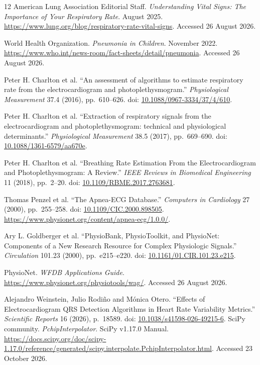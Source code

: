 \begin{thebibliography}{12}
American Lung Association Editorial Staff.
\emph{Understanding Vital Signs: The Importance of Your Respiratory Rate}.
August 2025. \url{https://www.lung.org/blog/respiratory-rate-vital-signs}.
Accessed 26 August 2026.

World Health Organization. \emph{Pneumonia in Children}.
November 2022. \url{https://www.who.int/news-room/fact-sheets/detail/pneumonia}.
Accessed 26 August 2026.

Peter H. Charlton et al.
``An assessment of algorithms to estimate respiratory rate from the electrocardiogram and photoplethysmogram.''
\emph{Physiological Measurement} 37.4 (2016), pp.~610--626.
doi: \href{https://doi.org/10.1088/0967-3334/37/4/610}{10.1088/0967-3334/37/4/610}.

Peter H. Charlton et al.
``Extraction of respiratory signals from the electrocardiogram and photoplethysmogram: technical and physiological determinants.''
\emph{Physiological Measurement} 38.5 (2017), pp.~669--690.
doi: \href{https://doi.org/10.1088/1361-6579/aa670e}{10.1088/1361-6579/aa670e}.

Peter H. Charlton et al.
``Breathing Rate Estimation From the Electrocardiogram and Photoplethysmogram: A Review.''
\emph{IEEE Reviews in Biomedical Engineering} 11 (2018), pp.~2--20.
doi: \href{https://doi.org/10.1109/RBME.2017.2763681}{10.1109/RBME.2017.2763681}.

Thomas Penzel et al. ``The Apnea-ECG Database.''
\emph{Computers in Cardiology} 27 (2000), pp.~255--258.
doi: \href{https://doi.org/10.1109/CIC.2000.898505}{10.1109/CIC.2000.898505}.
\url{https://www.physionet.org/content/apnea-ecg/1.0.0/}.

Ary L. Goldberger et al.
``PhysioBank, PhysioToolkit, and PhysioNet: Components of a New Research Resource for Complex Physiologic Signals.''
\emph{Circulation} 101.23 (2000), pp.~e215--e220.
doi: \href{https://doi.org/10.1161/01.CIR.101.23.e215}{10.1161/01.CIR.101.23.e215}.

PhysioNet. \emph{WFDB Applications Guide}.
\url{https://www.physionet.org/physiotools/wag/}.
Accessed 26 August 2026.

Alejandro Weinstein, Julio Rodi{\~n}o and M{\'o}nica Otero.
``Effects of Electrocardiogram QRS Detection Algorithms in Heart Rate Variability Metrics.''
\emph{Scientific Reports} 16 (2026), p.~18589.
doi: \href{https://doi.org/10.1038/s41598-026-49215-6}{10.1038/s41598-026-49215-6}.
SciPy community. \emph{PchipInterpolator}. SciPy v1.17.0 Manual.
\url{https://docs.scipy.org/doc/scipy-1.17.0/reference/generated/scipy.interpolate.PchipInterpolator.html}.
Accessed 23 October 2026.


\end{thebibliography}
